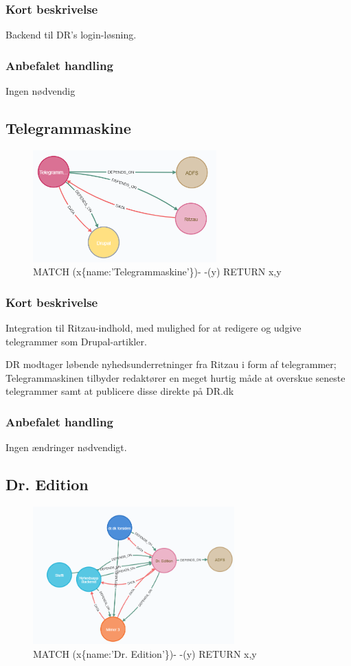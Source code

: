 \documentclass{article}
\begin{document}
\subsubsection{Kort beskrivelse}
Backend til DR's login-løsning.
\subsubsection{Anbefalet handling}
Ingen nødvendig


\subsection{Telegrammaskine}
\begin{figure}[h]
\includegraphics[width=200pt]{Telegrammaskine.PNG}
\caption{MATCH (x\{name:'Telegrammaskine'\})- -(y) RETURN x,y}
\end{figure}
\subsubsection{Kort beskrivelse}
Integration til Ritzau-indhold, med mulighed for at redigere og udgive telegrammer som Drupal-artikler.	

DR modtager løbende nyhedsunderretninger fra Ritzau i form af telegrammer; Telegrammaskinen tilbyder redaktører en meget hurtig måde at overskue seneste telegrammer samt at publicere disse direkte på DR.dk
\subsubsection{Anbefalet handling}
Ingen ændringer nødvendigt.


\subsection{Dr. Edition}
\begin{figure}[h]
\includegraphics[width=220pt]{DrEdition.PNG}
\caption{MATCH (x\{name:'Dr. Edition'\})- -(y) RETURN x,y}
\end{figure}
\end{document}
